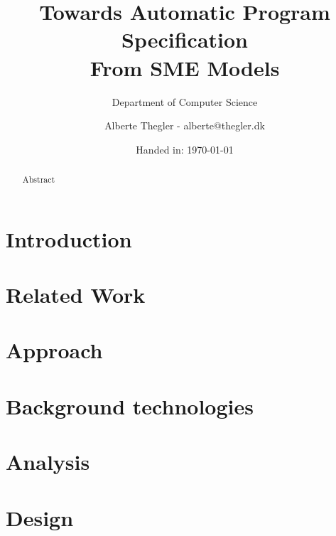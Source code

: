 \documentclass[a4paper]{report}
\author{Alberte Thegler - alberte@thegler.dk}
\title{Towards Automatic Program Specification \\ From SME Models}
\subtitle{Department of Computer Science}
\date{Handed in: \today}
\begin{document}
\maketitle

\begin{abstract}
\begin{doublespace}
Abstract
\end{doublespace}
\end{abstract}


\newpage
\tableofcontents

\newpage
{}



\chapter{Introduction}


% 

\chapter{Related Work}
\label{chap:related-work}


\chapter{Approach}


\chapter{Background technologies}


\chapter{Analysis}


\chapter{Design}

\end{document}
